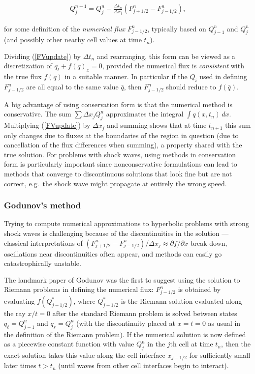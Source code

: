 \documentclass[11pt]{article}
\begin{document}
\begin{align}\label{FVupdate}
Q_j^{n+1} = Q_j^n - \frac{\Delta t_n}{\Delta x_j} (F_{j+1/2}^n - F_{j-1/2}^n),
\end{align}

for some definition of the \emph{numerical flux} \(F_{j-1/2}^n\),
typically based on \(Q_{j-1}^n\) and \(Q_j^n\) (and possibly other
nearby cell values at time \(t_n\)).

Dividing (\ref{FVupdate}) by \(\Delta t_n\) and rearranging, this form
can be viewed as a discretization of \(q_t + f(q)_x = 0\), provided the
numerical flux is \emph{consistent} with the true flux \(f(q)\) in a
suitable manner. In particular if the \(Q_i\) used in defining
\(F_{j-1/2}^n\) are all equal to the same value \(\bar q\), then
\(F_{j-1/2}^n\) should reduce to \(f(\bar q)\).

A big advantage of using conservation form is that the numerical method
is conservative. The sum \(\sum \Delta x_j Q_j^n\) approximates the
integral \(\int q(x,t_n)\,dx\). Multiplying (\ref{FVupdate}) by
\(\Delta x_j\) and summing shows that at time \(t_{n+1}\) this sum only
changes due to fluxes at the boundaries of the region in question (due
to cancellation of the flux differences when summing), a property shared
with the true solution. For problems with shock waves, using methods in
conservation form is particularly important since nonconservative
formulations can lead to methods that converge to discontinuous
solutions that look fine but are not correct, e.g.~the shock wave might
propagate at entirely the wrong speed.

    \hypertarget{godunovs-method}{%
\subsubsection{Godunov's method}\label{godunovs-method}}

Trying to compute numerical approximations to hyperbolic problems with
strong shock waves is challenging because of the discontinuities in the
solution --- classical interpretations of
\((F_{j+1/2}^n - F_{j-1/2}^n)/\Delta x_j \approx \partial f/ \partial x\)
break down, oscillations near discontinuities often appear, and methods
can easily go catastrophically unstable.

The landmark paper of Godunov \cite{godunov} was the first to suggest
using the solution to Riemann problems in defining the numerical flux:
\(F_{j-1/2}^n\) is obtained by evaluating \(f(Q_{j-1/2}^*)\), where
\(Q_{j-1/2}^*\) is the Riemann solution evaluated along the ray
\(x/t = 0\) after the standard Riemann problem is solved between states
\(q_\ell=Q_{j-1}^n\) and \(q_r=Q_j^n\) (with the discontinuity placed at
\(x=t=0\) as usual in the definition of the Riemann problem). If the
numerical solution is now defined as a piecewise constant function with
value \(Q_j^n\) in the \(j\)th cell at time \(t_n\), then the exact
solution takes this value along the cell interface \(x_{j-1/2}\) for
sufficiently small later times \(t > t_n\) (until waves from other cell
interfaces begin to interact).
\end{document}
